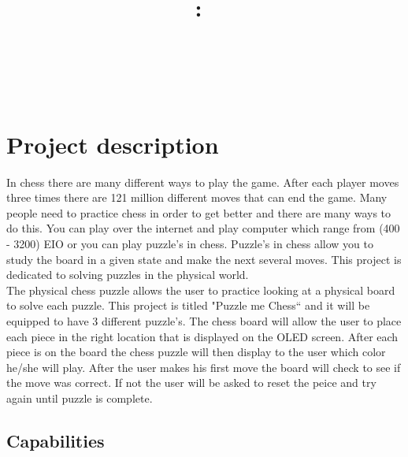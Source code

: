 \documentclass[11pt]{article}
\title{\vspace{2in}\textmd{\textbf{\hmwkClass:\ \hmwkTitle}}\\\normalsize\vspace{0.1in}\small{\hmwkDueDate}\\\vspace{0.1in}\large{\textit{\hmwkClassInstructor\ }}\vspace{3in}}
\date{}
\author{\textbf{\hmwkAuthorName}}
\begin{document}
\maketitle %
\newpage



\clearpage 
\section{Project description}
In chess there are many different ways to play the game. After each player moves three times there are 121 million different moves that can end the game. Many people need to practice chess in order to get better and there are many ways to do this. You can play over the internet and play computer which range from (400 - 3200) EIO or you can play puzzle's in chess. Puzzle's in chess allow you to study the board in a given state and make the next several moves. This project is dedicated to solving puzzles in the physical world. 
\\

\noindent The physical chess puzzle allows the user to practice looking at a physical board to solve each puzzle. This project is titled "Puzzle me Chess`` and it will be equipped to have 3 different puzzle's. The chess board will allow the user to place each piece in the right location that is displayed on the OLED screen. After each piece is on the board the chess puzzle will then display to the user which color he/she will play. After the user makes his first move the board will check to see if the move was correct. If not the user will be asked to reset the peice and try again until puzzle is complete. 

\subsection{Capabilities}
\end{document}
